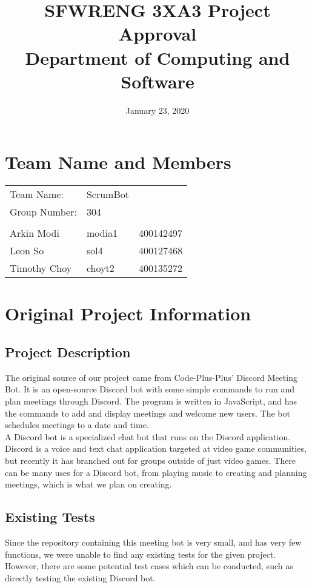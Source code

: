 \documentclass[12pt]{article}
\title{
    SFWRENG 3XA3 Project Approval\\
    \large Department of Computing and Software\\
}
\author{}
\date{January 23, 2020}
\begin{document}
\maketitle

\section{Team Name and Members}

\begin{tabular}{l l l}
    Team Name: & ScrumBot\\
    Group Number: & 304 \\
    \\
    Arkin Modi & modia1 & 400142497 \\
    Leon So & sol4 & 400127468 \\
    Timothy Choy & choyt2 & 400135272
\end{tabular}

\section{Original Project Information}
\subsection{Project Description}
The original source of our project came from Code-Plus-Plus' Discord Meeting Bot. It is an open-source Discord bot with some simple commands to run and plan meetings through Discord. The program is written in JavaScript, and has the commands to add and display meetings and welcome new users. The bot schedules meetings to a date and time.\\
A Discord bot is a specialized chat bot that runs on the Discord application. Discord is a voice and text chat application targeted at video game communities, but recently it has branched out for groups outside of just video games. There can be many uses for a Discord bot, from playing music to creating and planning meetings, which is what we plan on creating.

\subsection{Existing Tests}
Since the repository containing this meeting bot is very small, and has very few functions, we were unable to find any existing tests for the given project. However, there are some potential test cases which can be conducted, such as directly testing the existing Discord bot.
\end{document}
